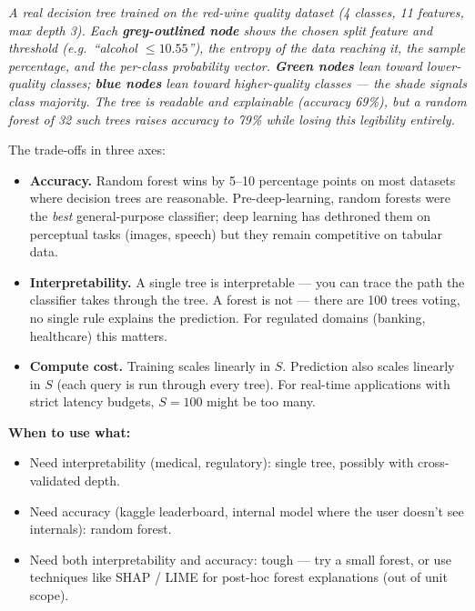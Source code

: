 \documentclass[11pt, a4paper]{article}
\begin{document}
\begin{center}

\footnotesize\textit{A real decision tree trained on the red-wine quality dataset (4 classes, 11 features, max depth 3). Each \textbf{grey-outlined node} shows the chosen split feature and threshold (e.g.\ ``alcohol $\le 10.55$''), the entropy of the data reaching it, the sample percentage, and the per-class probability vector. \textbf{Green nodes} lean toward lower-quality classes; \textbf{blue nodes} lean toward higher-quality classes --- the shade signals class majority. The tree is readable and explainable (accuracy 69\%), but a random forest of 32 such trees raises accuracy to 79\% while losing this legibility entirely.}
\end{center}

The trade-offs in three axes:

\begin{itemize}
  \item \textbf{Accuracy.} Random forest wins by 5--10 percentage points on most datasets where decision trees are reasonable. Pre-deep-learning, random forests were the \emph{best} general-purpose classifier; deep learning has dethroned them on perceptual tasks (images, speech) but they remain competitive on tabular data.
  \item \textbf{Interpretability.} A single tree is interpretable — you can trace the path the classifier takes through the tree. A forest is not — there are 100 trees voting, no single rule explains the prediction. For regulated domains (banking, healthcare) this matters.
  \item \textbf{Compute cost.} Training scales linearly in $S$. Prediction also scales linearly in $S$ (each query is run through every tree). For real-time applications with strict latency budgets, $S = 100$ might be too many.
\end{itemize}

\textbf{When to use what:}
\begin{itemize}
  \item Need interpretability (medical, regulatory): single tree, possibly with cross-validated depth.
  \item Need accuracy (kaggle leaderboard, internal model where the user doesn't see internals): random forest.
  \item Need both interpretability and accuracy: tough — try a small forest, or use techniques like SHAP / LIME for post-hoc forest explanations (out of unit scope).
\end{itemize}
\end{document}
